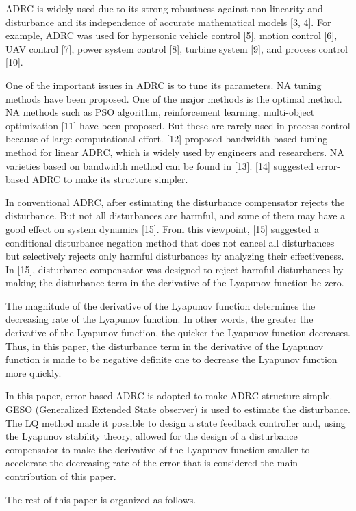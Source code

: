 \documentclass[10pt]{article}
\begin{document}
ADRC is widely used due to its strong robustness against non-linearity and disturbance and its independence of accurate mathematical models [3, 4]. For example, ADRC was used for hypersonic vehicle control [5], motion control [6], UAV control [7], power system control [8], turbine system [9], and process control [10].

One of the important issues in ADRC is to tune its parameters. NA tuning methods have been proposed. One of the major methods is the optimal method. NA methods such as PSO algorithm, reinforcement learning, multi-object optimization [11] have been proposed. But these are rarely used in process control because of large computational effort. [12] proposed bandwidth-based tuning method for linear ADRC, which is widely used by engineers and researchers. NA varieties based on bandwidth method can be found in [13]. [14] suggested error-based ADRC to make its structure simpler.

In conventional ADRC, after estimating the disturbance compensator rejects the disturbance. But not all disturbances are harmful, and some of them may have a good effect on system dynamics [15]. From this viewpoint, [15] suggested a conditional disturbance negation method that does not cancel all disturbances but selectively rejects only harmful disturbances by analyzing their effectiveness. In [15], disturbance compensator was designed to reject harmful disturbances by making the disturbance term in the derivative of the Lyapunov function be zero.

The magnitude of the derivative of the Lyapunov function determines the decreasing rate of the Lyapunov function. In other words, the greater the derivative of the Lyapunov function, the quicker the Lyapunov function decreases. Thus, in this paper, the disturbance term in the derivative of the Lyapunov function is made to be negative definite one to decrease the Lyapunov function more quickly.

In this paper, error-based ADRC is adopted to make ADRC structure simple. GESO (Generalized Extended State observer) is used to estimate the disturbance. The LQ method made it possible to design a state feedback controller and, using the Lyapunov stability theory, allowed for the design of a disturbance compensator to make the derivative of the Lyapunov function smaller to accelerate the decreasing rate of the error that is considered the main contribution of this paper.

The rest of this paper is organized as follows.
\end{document}
